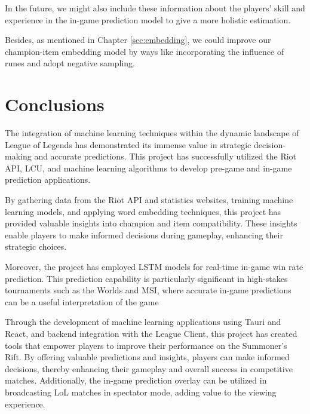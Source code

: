 \documentclass[11pt,a4paper,oneside]{report}
\newcommand{\instructions}[1]{{\color{orange}\itshape #1}}
\renewcommand{\instructions}[1]{}
\begin{document}
In the future, we might also include these information about the players' skill and experience in the in-game prediction model to give a more holistic estimation.

Besides, as mentioned in Chapter \ref{sec:embedding}, we could improve our champion-item embedding model by ways like incorporating the influence of runes and adopt negative sampling.


\chapter{Conclusions}
\label{conclusions}

\instructions{This section is written to put the interpretation of the results
  into the context of the original problem.~ Do not repeat the discussion
  points or include irrelevant material. The conclusion should be based on
  the evidence presented.}


The integration of machine learning techniques within the dynamic landscape of League of Legends has demonstrated its immense value in strategic decision-making and accurate predictions. This project has successfully utilized the Riot API, LCU, and machine learning algorithms to develop pre-game and in-game prediction applications.

By gathering data from the Riot API and statistics websites, training machine learning models, and applying word embedding techniques, this project has provided valuable insights into champion and item compatibility. These insights enable players to make informed decisions during gameplay, enhancing their strategic choices.

Moreover, the project has employed LSTM models for real-time in-game win rate prediction. This prediction capability is particularly significant in high-stakes tournaments such as the Worlds and MSI, where accurate in-game predictions can be a useful interpretation of the game

Through the development of machine learning applications using Tauri and React, and backend integration with the League Client, this project has created tools that empower players to improve their performance on the Summoner's Rift. By offering valuable predictions and insights, players can make informed decisions, thereby enhancing their gameplay and overall success in competitive matches. Additionally, the in-game prediction overlay can be utilized in broadcasting LoL matches in spectator mode, adding value to the viewing experience.
\end{document}
